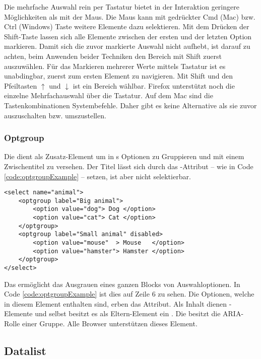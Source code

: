 Die mehrfache Auswahl rein per Tastatur bietet in der Interaktion geringere Möglichkeiten als mit der Maus. 
Die Maus kann mit gedrückter Cmd (Mac) bzw. Ctrl (Windows) Taste weitere Elemente dazu selektieren. 
Mit dem Drücken der Shift-Taste lassen sich alle Elemente zwischen der ersten und der letzten Option markieren. 
Damit sich die zuvor markierte Auswahl nicht aufhebt, ist darauf zu achten, beim Anwenden beider Techniken den Bereich mit Shift zuerst auszuwählen. 
Für das Markieren mehrerer Werte mittels Tastatur ist es unabdingbar, zuerst zum ersten Element zu navigieren. 
Mit Shift und den Pfeiltasten $\uparrow$ und $\downarrow$ ist ein Bereich wählbar. 
Firefox unterstützt noch die einzelne Mehrfachauswahl über die Tastatur. 
Auf dem Mac sind die Tastenkombinationen Systembefehle. 
Daher gibt es keine Alternative als sie zuvor auszuschalten bzw. umszustellen. 


\subsubsection{\color{dgray} Optgroup}
\label{sec:optgroup}

Die  dient als Zusatz-Element um in s Optionen zu Gruppieren und mit einem Zwischentitel zu versehen. 
Der Titel lässt sich durch das -Attribut – wie in Code \ref{code:optgroupExample} – setzen, ist aber nicht selektierbar. 

\begin{lstlisting}[style = htmlcssjs, caption = Optgroup Beispiel, label = code:optgroupExample]
<select name="animal">
    <optgroup label="Big animal">
        <option value="dog"> Dog </option>
        <option value="cat"> Cat </option>
    </optgroup>
    <optgroup label="Small animal" disabled>
        <option value="mouse"  > Mouse   </option>
        <option value="hamster"> Hamster </option>
    </optgroup>
</select>
\end{lstlisting}

Das  ermöglicht das Ausgrauen eines ganzen Blocks von Auswahloptionen. 
In Code \ref{code:optgroupExample} ist dies auf Zeile 6 zu sehen. 
Die Optionen, welche in diesem Element enthalten sind, erben das Attribut. 
Als Inhalt dienen -Elemente und selbst besitzt es als Eltern-Element ein . 
Die  besitzt die ARIA-Rolle einer Gruppe. 
Alle Browser unterstützen dieses Element. 


\subsection{Datalist}
\label{sec:datalist}

